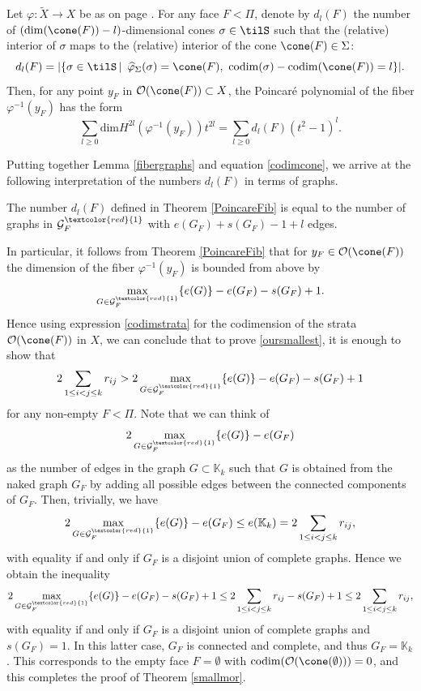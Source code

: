 \begin{theorem}\label{PoincareFib}
Let $\varphi: \widetilde{X}\to X$ be as on page \pageref{omitnot}. For any face 
$F<\Pi$, denote by
$d_l(F)$  the number of $(\mathrm{dim}(\cone(F))-l)$-dimensional cones 
$\sigma\in\tilS$ such that the (relative) interior of $\sigma$ maps to the 
(relative) interior of 
the cone $\cone(F)\in\Sigma$:
$$d_l(F) = |\{\sigma\in\tilS \, | \,\,\, 
\widehat{\varphi}_\Sigma(\sigma)=\cone(F), \,\, 
\mathrm{codim}(\sigma)-\mathrm{codim}(\cone(F))=l\}|.$$ 
Then, for any point  $y_F$ in $\mathcal{O}(\cone(F))\subset X$, the Poincar\'e 
polynomial of the fiber $\varphi^{-1}(y_F)$ has the form
$$\sum_{l\geq 0} \mathrm{dim}H^{2l}(\varphi^{-1}(y_F))t^{2l} = \sum_{l\geq 0} d_l(F)(t^2-1)^l. $$
\end{theorem}
Putting together Lemma \ref{fibergraphs} and equation \eqref{codimcone}, we arrive at the following interpretation of the numbers $d_l(F)$ in terms of graphs. 
\begin{lemma}\label{dlgraphs}
The number $d_l(F)$ defined in Theorem \ref{PoincareFib} is equal to the number 
of graphs in $\mathcal{G}^{\textcolor{red}{1}}_F$ with $e(G_F)+s(G_F)-1+l$ 
edges. 
\end{lemma}
In particular, it follows from Theorem \ref{PoincareFib} that for 
$y_F\in\mathcal{O}(\cone(F))$ the dimension of the fiber $\varphi^{-1}(y_F)$ is 
bounded from above by 
$$ \displaystyle{\max_{G\in\mathcal{G}^{\textcolor{red}{1}}_F}} \{e(G)\}-e(G_F)-s(G_F)+1. $$
Hence using expression \eqref{codimstrata} for the codimension of the strata
 $\mathcal{O}(\cone(F))$ in $X$, we can conclude that to prove 
\eqref{oursmallest}, it is enough to show that
\begin{equation} 
2\sum_{1\leq i< j\leq k}r_{ij} > \displaystyle{2\max_{G\in\mathcal{G}^{\textcolor{red}{1}}_F}} \{e(G)\} - e(G_F)-s(G_F)+1 
\end{equation}
for any non-empty $F<\Pi$. Note that we can think of 
$$\displaystyle{2\max_{G\in\mathcal{G}^{\textcolor{red}{1}}_F}} \{e(G)\} - 
e(G_F)$$ as the number of edges in the graph $G\subset\mathbb{K}_k$ such that 
$G$ is obtained from the naked graph $G_F$ by adding all possible edges between 
the connected components of $G_F$. Then,  trivially, we have
$$\displaystyle{2\max_{G\in\mathcal{G}^{\textcolor{red}{1}}_F}} \{e(G)\} - 
e(G_F) \leq e(\mathbb{K}_k) = 2\sum_{1\leq i< j\leq k}r_{ij},$$ with equality 
if and only if $G_F$ is a disjoint union of complete graphs. Hence we obtain 
the inequality  
$$\displaystyle{2\max_{G\in\mathcal{G}^{\textcolor{red}{1}}_F}} \{e(G)\} - e(G_F)-s(G_F)+1 \leq 2\sum_{1\leq i< j\leq k}r_{ij} - s(G_F)+1 \leq 2\sum_{1\leq i< j\leq k}r_{ij},$$
with equality if and only if $G_F$ is a disjoint union of complete graphs and 
$s(G_F)=1$. In this latter case, $G_F$ is connected and complete, and thus 
$G_F=\mathbb{K}_k$. This corresponds to the empty face $F=\emptyset$ with  
$\mathrm{codim}(\mathcal{O}(\cone(\emptyset))) = 0$, and this completes the 
proof of Theorem \ref{smallmor}. 

